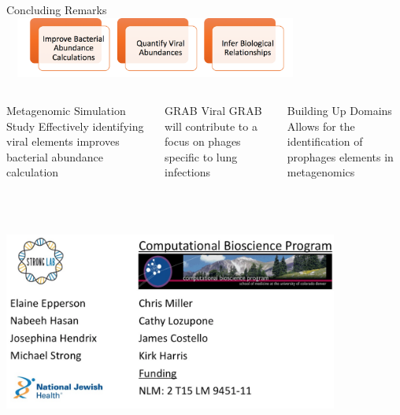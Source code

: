 \documentclass[11pt]{beamer}
\begin{document}
\section{}

	\begin{frame}{Concluding Remarks}
	\center
	\includegraphics[height=2cm, width=10cm]{goals.png}
	\begin{columns}
	\begin{block}{Metagenomic Simulation Study}
	Effectively identifying viral elements improves bacterial abundance calculation
	\end{block}
	\begin{block}{GRAB}
	Viral GRAB will contribute to a focus on phages specific to lung infections
	\end{block}
	\begin{block}{Building Up Domains}
	Allows for the identification of prophages elements in metagenomics
	\end{block}
	
	\end{columns}
	
	\end{frame}
	
	
	
	
	\begin{frame}{}
	\vspace{1cm}
	{\includegraphics[height=8cm, width=11cm]{Acknowledgements.png} }
	\end{frame}
	
\end{document}
